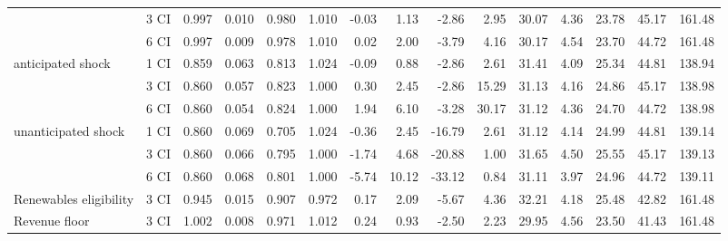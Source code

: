 \begin{tabular}{ll*{13}{r}}
              & 3 CI &                    0.997 &  0.010 &  0.980 &  1.010 &                   -0.03 &   1.13 &   -2.86 &   2.95 &          30.07 &  4.36 &  23.78 &  45.17 &                 161.48 \\
              & 6 CI &                    0.997 &  0.009 &  0.978 &  1.010 &                    0.02 &   2.00 &   -3.79 &   4.16 &          30.17 &  4.54 &  23.70 &  44.72 &                 161.48 \\
anticipated shock & 1 CI &                    0.859 &  0.063 &  0.813 &  1.024 &                   -0.09 &   0.88 &   -2.86 &   2.61 &          31.41 &  4.09 &  25.34 &  44.81 &                 138.94 \\
              & 3 CI &                    0.860 &  0.057 &  0.823 &  1.000 &                    0.30 &   2.45 &   -2.86 &  15.29 &          31.13 &  4.16 &  24.86 &  45.17 &                 138.98 \\
              & 6 CI &                    0.860 &  0.054 &  0.824 &  1.000 &                    1.94 &   6.10 &   -3.28 &  30.17 &          31.12 &  4.36 &  24.70 &  44.72 &                 138.98 \\
unanticipated shock & 1 CI &                    0.860 &  0.069 &  0.705 &  1.024 &                   -0.36 &   2.45 &  -16.79 &   2.61 &          31.12 &  4.14 &  24.99 &  44.81 &                 139.14 \\
              & 3 CI &                    0.860 &  0.066 &  0.795 &  1.000 &                   -1.74 &   4.68 &  -20.88 &   1.00 &          31.65 &  4.50 &  25.55 &  45.17 &                 139.13 \\
              & 6 CI &                    0.860 &  0.068 &  0.801 &  1.000 &                   -5.74 &  10.12 &  -33.12 &   0.84 &          31.11 &  3.97 &  24.96 &  44.72 &                 139.11 \\
Renewables eligibility & 3 CI &                    0.945 &  0.015 &  0.907 &  0.972 &                    0.17 &   2.09 &   -5.67 &   4.36 &          32.21 &  4.18 &  25.48 &  42.82 &                 161.48 \\
Revenue floor & 3 CI &                    1.002 &  0.008 &  0.971 &  1.012 &                    0.24 &   0.93 &   -2.50 &   2.23 &          29.95 &  4.56 &  23.50 &  41.43 &                 161.48 \\
\bottomrule
\end{tabular}
